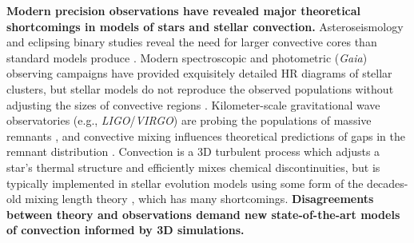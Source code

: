 \documentclass[12pt]{article} %
\begin{document}
\textbf{Modern precision observations have revealed major theoretical shortcomings in models of stars and stellar convection.}
Asteroseismology and eclipsing binary studies reveal the need for larger convective cores than standard models produce \citep{johnston2021}.
Modern spectroscopic and photometric (\emph{Gaia}) observing campaigns have provided exquisitely detailed HR diagrams of stellar clusters, but stellar models do not reproduce the observed populations without adjusting the sizes of convective regions \citep{castro_etal_2014,gaia_2018,martinet_etal_2021}.
Kilometer-scale gravitational wave observatories (e.g., \emph{LIGO}/\emph{VIRGO}) are probing the populations of massive remnants \citep{abbott_etal_2018}, and convective mixing influences theoretical predictions of gaps in the remnant distribution \citep{vanson_etal_2022,farmer_etal_2019}.
Convection is a 3D turbulent process which adjusts a star's thermal structure and efficiently mixes chemical discontinuities, but is typically implemented in stellar evolution models using some form of the decades-old mixing length theory \citep[MLT,][]{bohmvitense_1958}, which has many shortcomings.
\textbf{Disagreements between theory and observations demand new state-of-the-art models of convection informed by 3D simulations. }
\end{document}
